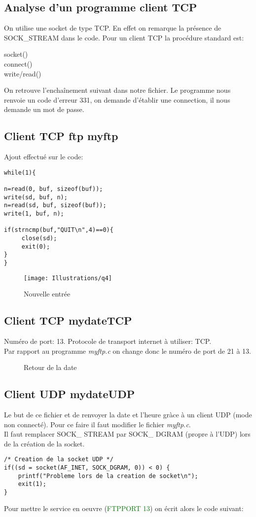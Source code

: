 \documentclass[paper=a4, fontsize=12pt]{article}
\numberwithin{equation}{section}		%
\numberwithin{figure}{section}			%
\numberwithin{table}{section}				%
\begin{document}
\subsection{Analyse d'un programme client TCP}

On utilise une socket de type TCP. En effet on remarque la présence de SOCK\_STREAM dans le code. 
Pour un client TCP la procédure standard est:

\begin{center}
socket() \\
connect()\\
write/read()\\
\end{center}
On retrouve l'enchaînement suivant dans notre fichier.
Le programme nous renvoie un code d'erreur 331, on demande d'établir une connection, il nous demande un mot de passe.

\subsection{Client TCP ftp myftp}
Ajout effectué sur le code:
\begin{verbatim}
while(1){

n=read(0, buf, sizeof(buf));
write(sd, buf, n);
n=read(sd, buf, sizeof(buf));
write(1, buf, n);
   
if(strncmp(buf,"QUIT\n",4)==0){
     close(sd);
     exit(0);
}
}
\end{verbatim}
\begin{figure}[h!]
\centerline{\texttt{[image: Illustrations/q4]}}
\caption{\label{Illustrations/q4} Nouvelle entrée}
\end{figure}
\subsection{Client TCP mydateTCP}
Numéro de port: 13. Protocole de transport internet à utiliser: TCP.\\
Par rapport au programme \textit{myftp.c} on change donc le numéro de port de 21 à 13.
\begin{figure}[h!]
\caption{\label{Illustrations/q5}Retour de la date}
\end{figure}
\subsection{Client UDP mydateUDP}
Le but de ce fichier et de renvoyer la date et l'heure gràce à un client UDP (mode non connecté). Pour ce faire il faut modifier le fichier \textit{myftp.c}.
\\
Il faut remplacer SOCK\_ STREAM par SOCK\_ DGRAM (propre à l'UDP) lors de la création de la socket.
\begin{verbatim}
/* Creation de la socket UDP */
if((sd = socket(AF_INET, SOCK_DGRAM, 0)) < 0) {
	printf("Probleme lors de la creation de socket\n");
	exit(1);
}
\end{verbatim}
Pour mettre le service en oeuvre (\textcolor{green}{FTPPORT 13}) on écrit alors le code suivant:
\end{document}

